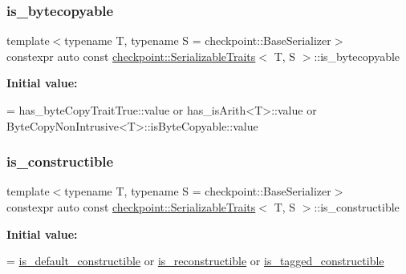 \mbox{\label{structcheckpoint_1_1_serializable_traits_a19e58ea0f510be10502e476258ed14ae}} 
\subsubsection{\texorpdfstring{is\+\_\+bytecopyable}{is\_bytecopyable}}
{\footnotesize\ttfamily template$<$typename T, typename S = checkpoint\+::\+Base\+Serializer$>$ \\
constexpr auto const \hyperlink{structcheckpoint_1_1_serializable_traits}{checkpoint\+::\+Serializable\+Traits}$<$ T, S $>$\+::is\+\_\+bytecopyable\hspace{0.3cm}{\ttfamily [static]}}

{\bfseries Initial value\+:}
\begin{DoxyCode}
=
    has\_byteCopyTraitTrue::value or has\_isArith<T>::value or
    ByteCopyNonIntrusive<T>::isByteCopyable::value
\end{DoxyCode}
\mbox{\label{structcheckpoint_1_1_serializable_traits_a7720e2f57d1b3d2f87fd022b47d0b775}} 
\subsubsection{\texorpdfstring{is\+\_\+constructible}{is\_constructible}}
{\footnotesize\ttfamily template$<$typename T, typename S = checkpoint\+::\+Base\+Serializer$>$ \\
constexpr auto const \hyperlink{structcheckpoint_1_1_serializable_traits}{checkpoint\+::\+Serializable\+Traits}$<$ T, S $>$\+::is\+\_\+constructible\hspace{0.3cm}{\ttfamily [static]}}

{\bfseries Initial value\+:}
\begin{DoxyCode}
=
    \hyperlink{structcheckpoint_1_1_serializable_traits_a4bdbe26cdd11c7ff07f84e4cfdf34e7f}{is\_default\_constructible} or \hyperlink{structcheckpoint_1_1_serializable_traits_a6cc78a7cc9b4645727c92437619fce83}{is\_reconstructible} or 
      \hyperlink{structcheckpoint_1_1_serializable_traits_aa6618d9f36e37127006112c73755fceb}{is\_tagged\_constructible}
\end{DoxyCode}
\mbox{\label{structcheckpoint_1_1_serializable_traits_a4bdbe26cdd11c7ff07f84e4cfdf34e7f}} 
